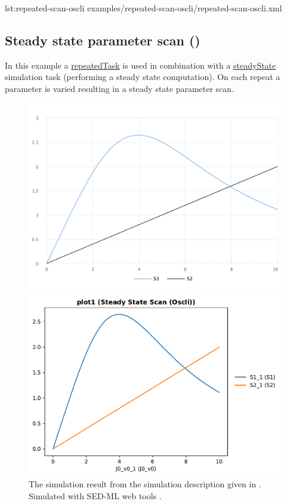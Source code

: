 {lst:repeated-scan-oscli}
{examples/repeated-scan-oscli/repeated-scan-oscli.xml}

\subsection{Steady state parameter scan ()}
In this example a \hyperref[class:repeatedTask]{repeatedTask} is used in combination with a \hyperref[class:steadyState]{steadyState} simulation task (performing a steady state computation). On each repeat a parameter is varied resulting in a steady state parameter scan.

\begin{figure}[ht!]
    \centering
    \begin{minipage}{0.47\textwidth}
        \centering
        \includegraphics[width=1.0\textwidth]{examples/repeated-steady-scan-oscli/results/sedml_webtools/plot1}
        \caption{The simulation result from the simulation description given in . Simulated with SED-ML web tools \citep{bergmann2017sed}.}
    \end{minipage}\hfill
    \begin{minipage}{0.47\textwidth}
        \centering
        \includegraphics[width=1.0\textwidth]{examples/repeated-steady-scan-oscli/results/tellurium/plot1}

\end{minipage}
\end{figure}
